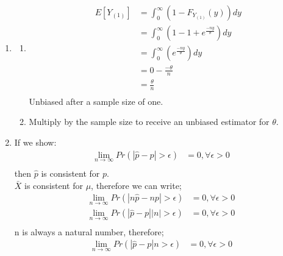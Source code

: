 \documentclass{article}
\begin{document}

\begin{enumerate}

\item 
	\begin{enumerate}
	\item
		\begin{equation*}
		\begin{split}
		E[Y_{(1)}] & = \int_{0}^{\infty} (1-F_{Y_{(1)}}(y))dy \\
		& = \int_{0}^{\infty} (1-1+e^{\frac{-ny}{\theta}})dy \\
		& = \int_{0}^{\infty} (e^{\frac{-ny}{\theta}})dy \\
		& = 0-\frac{-\theta}{n}\\
		& = \frac{\theta}{n}\\
		\end{split}
		\end{equation*}
		Unbiased after a sample size of one.
	\item
		Multiply by the sample size to receive an unbiased estimator for $\theta$.
	\end{enumerate}
\item
	If we show:
	\begin{equation*}
	\begin{split}
	\lim_{n\rightarrow \infty} Pr(\left| \hat{p} - p \right| > \epsilon) &= 0, \forall \epsilon > 0 \\
	\end{split}
	\end{equation*}
	then $\hat{p}$ is consistent for $p$.	\\
	$\bar{X}$ is consistent for $\mu$, therefore we can write;
	\begin{equation*}
	\begin{split}
	\lim_{n\rightarrow \infty} Pr(\left| n\hat{p} - np \right| > \epsilon) &= 0, \forall \epsilon > 0 \\
	\lim_{n\rightarrow \infty} Pr(\left| \hat{p} - p \right|\left|n\right| > \epsilon) &= 0, \forall \epsilon > 0 \\
	\end{split}
	\end{equation*}	
	n is always a natural number, therefore;
	\begin{equation*}
	\begin{split}
	\lim_{n\rightarrow \infty} Pr(\left| \hat{p} - p \right|n > \epsilon) &= 0, \forall \epsilon > 0 \\

\end{split}
\end{equation*}
\end{enumerate}
\end{document}
